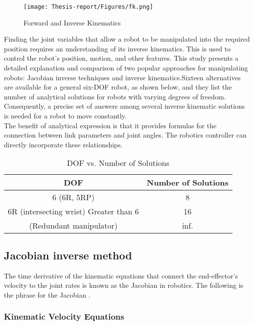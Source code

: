 \documentclass[12pt]{article}
\begin{document}
\begin{figure}[h]
    \centering
    \texttt{[image: Thesis-report/Figures/fk.png]}  
    \caption{Forward and Inverse Kinematics \cite{ref10}}
    \label{fig:inverse-kinematics}
\end{figure}

Finding the joint variables that allow a robot to be manipulated into the required position requires an understanding of its inverse kinematics. This is used to control the robot's position, motion, and other features. This study presents a detailed explanation and comparison of two popular approaches for manipulating robots: Jacobian inverse techniques and inverse kinematics.Sixteen alternatives are available for a general six-DOF robot, as shown below, and they list the number of analytical solutions for robots with varying degrees of freedom. Consequently, a precise set of answers among several inverse kinematic solutions is needed for a robot to move constantly\cite{ref10}.\\


The benefit of analytical expression is that it provides formulas for the connection between link parameters and joint angles. The robotics controller can directly incorporate these relationships\cite{ref10}.\\

\begin{table}[h]
    \centering
    \begin{tabular}{cc}
        \toprule
        \textbf{DOF} & \textbf{Number of Solutions} \\
        \midrule
        6 (6R, 5RP) & 8 \\
        6R (intersecting wrist)
Greater than 6 & 16\\
        (Redundant manipulator) & inf.\\
        \bottomrule
    \end{tabular}
    \caption{DOF vs. Number of Solutions \cite{ref19}}
    \label{tab:dof_solutions}
\end{table}
\newpage
\subsection{Jacobian inverse method}
The time derivative of the kinematic equations that connect the end-effector's velocity to the joint rates is known as the Jacobian in robotics. The following is the phrase for the Jacobian \cite{ref19}.
\subsubsection{Kinematic Velocity Equations}
\end{document}
